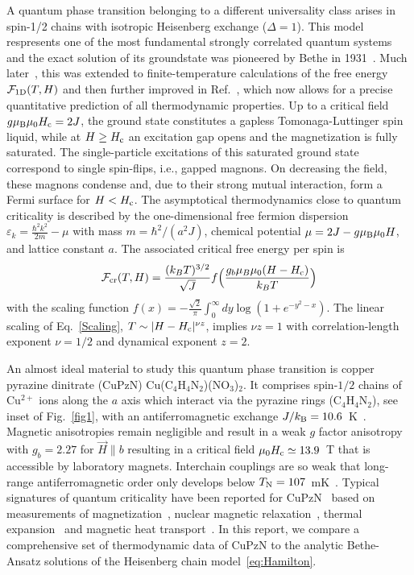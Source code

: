 \documentclass[12pt]{article}
\begin{document}
A quantum phase transition belonging to a different universality class arises in spin-1/2 chains with isotropic Heisenberg exchange ($\Delta =1$). This model respresents one of the most fundamental strongly correlated quantum systems and the exact solution of its groundstate was pioneered by Bethe in 1931~\cite{Bethe1931}. Much later~\cite{Takahashi1971,Gaudin1971}, this was extended to finite-temperature calculations of the free energy $\mathcal{F}_{\rm 1D}(T,H)$ and then further improved in Ref.~\cite{Klumper1998}, which now allows for a precise quantitative prediction of all thermodynamic properties. Up to a critical field $g  \mu_{\rm B} \mu_0H_{\rm c}=2J$, the ground state constitutes a gapless Tomonaga-Luttinger spin liquid, while at $H\ge H_{\rm c}$ an excitation gap opens and the magnetization is fully saturated. The single-particle excitations of this saturated ground state correspond to single spin-flips, i.e., gapped magnons. On decreasing the field, these magnons condense and, due to their strong mutual interaction, form a Fermi surface for $H<H_{\rm c}$. The asymptotical thermodynamics close to quantum criticality is described by the one-dimensional free fermion dispersion $\varepsilon_k = \frac{\hbar^2 k^2}{2m} - \mu$  with mass $m = \hbar^2/(a^2 J)$, chemical potential $\mu = 2 J - g  \mu_{\rm B} \mu_0H $, and lattice constant $a$. The associated critical free energy per spin is 
\begin{align} \label{Scaling}
\mathcal{F}_{\rm cr}(T,H) = \frac{(k_B T)^{3/2}}{\sqrt{J}}  f\Big(\frac{g_b  \mu_B \mu_0(H - H_{\rm c})}{k_B T} \Big)
\end{align}
%
with the scaling function 
$f(x) = -\frac{\sqrt{2}}{\pi} \int_{0}^{\infty} dy \log(1 + e^{-y^2-x})$.
The linear scaling of Eq.~\eqref{Scaling}, $T \sim |H - H_{\rm c}|^{\nu z}$, implies $\nu z = 1$ with correlation-length exponent $\nu=1/2$ and dynamical exponent $z=2$.

An almost ideal material to study this quantum phase transition is copper pyrazine dinitrate (CuPzN) Cu(C$_4$H$_4$N$_2$)(NO$_3$)$_2$. It comprises spin-$1/2$ chains of Cu$^{2+}$ ions  along the $a$ axis which interact via the pyrazine rings (C$_4$H$_4$N$_2$), see inset of Fig.~\ref{fig1}, with an antiferromagnetic exchange $J/k_{\rm B} = 10.6$~K~\cite{Hammar1999,Stone2003}. Magnetic anisotropies remain negligible and result in a weak $g$ factor anisotropy~\cite{McGregor1976} with $g_b = 2.27$ for $\vec H\|b$ resulting in a critical field $\mu_0 H_{\rm c}\simeq 13.9$~T that is accessible by laboratory magnets. Interchain couplings are so weak that long-range antiferromagnetic order only develops below $T_{\rm N}= 107$~mK~\cite{Lancaster2006}. Typical signatures of quantum criticality have been reported for CuPzN~\cite{Jeong2015} based on measurements of magnetization~\cite{Kono2015}, nuclear magnetic relaxation~\cite{Kuhne2009}, thermal expansion~\cite{Rohrkamp2010} and magnetic heat transport~\cite{Sologubenko2007a}. In this report, we compare a comprehensive set of thermodynamic data of CuPzN to the analytic Bethe-Ansatz solutions of the Heisenberg chain model~\eqref{eq:Hamilton}. 
\end{document}
